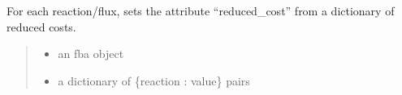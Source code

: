 \documentclass[letterpaper,12pt,english]{sphinxmanual}
\begin{document}
\begin{fulllineitems}
\label{\detokenize{api/solvers:cbmpy.CBGLPK.setReducedCosts}}
\pysigstartsignatures
\pysiglinewithargsret
{}
{\sphinxparamcomma {}}
{}
\pysigstopsignatures
\sphinxAtStartPar
For each reaction/flux, sets the attribute “reduced\_cost” from a dictionary of reduced costs.
\begin{quote}\begin{description}
\begin{itemize}
\item {} 
\sphinxAtStartPar
{} \textendash{} an fba object

\item {} 
\sphinxAtStartPar
{} \textendash{} a dictionary of \{reaction : value\} pairs

\end{itemize}

\end{description}\end{quote}

\end{fulllineitems}

\end{document}
